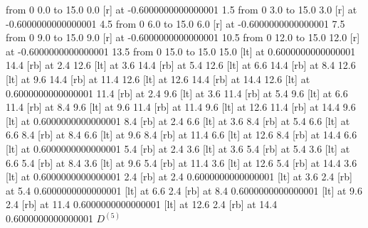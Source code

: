   \putrule from 0 0.0 to 15.0 0.0
   [r] at -0.6000000000000001 1.5
  \putrule from 0 3.0 to 15.0 3.0
   [r] at -0.6000000000000001 4.5
  \putrule from 0 6.0 to 15.0 6.0
   [r] at -0.6000000000000001 7.5
  \putrule from 0 9.0 to 15.0 9.0
   [r] at -0.6000000000000001 10.5
  \putrule from 0 12.0 to 15.0 12.0
   [r] at -0.6000000000000001 13.5
  \putrule from 0 15.0 to 15.0 15.0
 [lt] at 0.6000000000000001 14.4
 [rb] at 2.4 12.6
 [lt] at 3.6 14.4
 [rb] at 5.4 12.6
 [lt] at 6.6 14.4
 [rb] at 8.4 12.6
 [lt] at 9.6 14.4
 [rb] at 11.4 12.6
 [lt] at 12.6 14.4
 [rb] at 14.4 12.6
 [lt] at 0.6000000000000001 11.4
 [rb] at 2.4 9.6
 [lt] at 3.6 11.4
 [rb] at 5.4 9.6
 [lt] at 6.6 11.4
 [rb] at 8.4 9.6
 [lt] at 9.6 11.4
 [rb] at 11.4 9.6
 [lt] at 12.6 11.4
 [rb] at 14.4 9.6
 [lt] at 0.6000000000000001 8.4
 [rb] at 2.4 6.6
 [lt] at 3.6 8.4
 [rb] at 5.4 6.6
 [lt] at 6.6 8.4
 [rb] at 8.4 6.6
 [lt] at 9.6 8.4
 [rb] at 11.4 6.6
 [lt] at 12.6 8.4
 [rb] at 14.4 6.6
 [lt] at 0.6000000000000001 5.4
 [rb] at 2.4 3.6
 [lt] at 3.6 5.4
 [rb] at 5.4 3.6
 [lt] at 6.6 5.4
 [rb] at 8.4 3.6
 [lt] at 9.6 5.4
 [rb] at 11.4 3.6
 [lt] at 12.6 5.4
 [rb] at 14.4 3.6
 [lt] at 0.6000000000000001 2.4
 [rb] at 2.4 0.6000000000000001
 [lt] at 3.6 2.4
 [rb] at 5.4 0.6000000000000001
 [lt] at 6.6 2.4
 [rb] at 8.4 0.6000000000000001
 [lt] at 9.6 2.4
 [rb] at 11.4 0.6000000000000001
 [lt] at 12.6 2.4
 [rb] at 14.4 0.6000000000000001
\endpicture
\bigskip
\vfil\eject
$\displaystyle D^{(5)}$
\bigskip
\bigskip
\vfil\eject
\vfil\eject\bye
